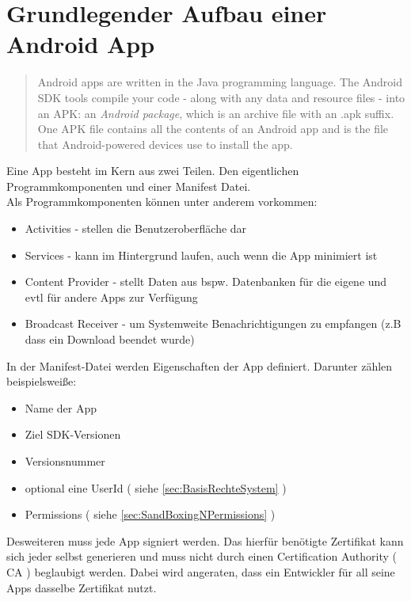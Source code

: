 	\section{Grundlegender Aufbau einer Android App}
	\begin{quote}
	Android apps are written in the Java programming language. The Android SDK tools compile your code - along with any data and resource files - into an APK: an \textit{Android package}, which is an archive file with an .apk suffix. One APK file contains all the contents of an Android app and is the file that Android-powered devices use to install the app.
	\end{quote}
	
	Eine App besteht im Kern aus zwei Teilen. Den eigentlichen Programmkomponenten und einer Manifest Datei.
	\\
	Als Programmkomponenten können unter anderem vorkommen:
	\begin{itemize}\itemsep0pt
		\item Activities - stellen die Benutzeroberfläche dar
		\item Services - kann im Hintergrund laufen, auch wenn die App minimiert ist
		\item Content Provider - stellt Daten aus bspw. Datenbanken für die eigene und evtl für andere Apps zur Verfügung
		\item Broadcast Receiver - um Systemweite Benachrichtigungen zu empfangen (z.B dass ein Download beendet wurde)
	\end{itemize}
	In der Manifest-Datei werden Eigenschaften der App definiert. Darunter zählen beispielsweiße:
	\begin{itemize}\itemsep0pt
		\item Name der App
		\item Ziel SDK-Versionen
		\item Versionsnummer
		\item optional eine UserId ( siehe \ref*{sec:BasisRechteSystem} )
		\item Permissions ( siehe \ref*{sec:SandBoxingNPermissions} )
	\end{itemize}
	Desweiteren muss jede App signiert werden. Das hierfür benötigte Zertifikat kann sich jeder selbst generieren und muss nicht durch einen Certification Authority ( CA ) beglaubigt werden. Dabei wird angeraten, dass ein Entwickler für all seine Apps dasselbe Zertifikat nutzt.